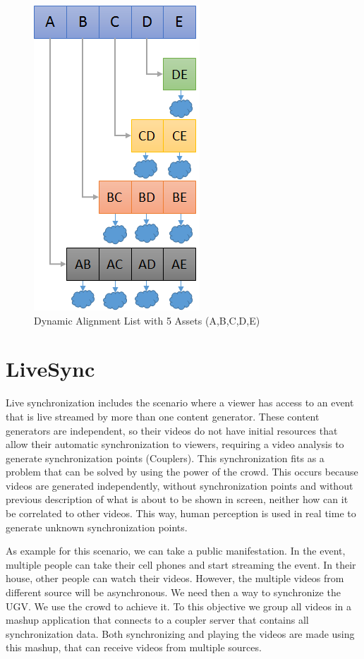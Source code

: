 \documentclass{sig-alternate-05-2015}
\begin{document}
\begin{figure}[h]
	\centering
	\includegraphics[scale=0.6]{figure/dal}
	\caption{Dynamic Alignment List with 5 Assets (A,B,C,D,E)}
	\label{dal}
\end{figure}

\section{LiveSync}
Live synchronization includes the scenario where a viewer has access to an event that is live streamed by more than one content generator. These content generators are independent, so their videos do not have initial resources that allow their automatic synchronization to viewers, requiring a video analysis to generate synchronization points (Couplers). This synchronization fits as a problem that can be solved by using the power of the crowd. This occurs because videos are generated independently, without synchronization points and without previous description of what is about to be shown in screen, neither how can it be correlated to other videos. This way, human perception is used in real time to generate unknown synchronization points. 

As example for this scenario, we can take a public manifestation. In the event, multiple people can take their cell phones and start streaming the event. In their house, other people can watch their videos. However, the multiple videos from different source will be asynchronous. We need then a way to synchronize the UGV. We use the crowd to achieve it. To this objective we group all videos in a mashup application that connects to a coupler server that contains all synchronization data. Both synchronizing and playing the videos are made using this mashup, that can receive videos from multiple sources.
\end{document}

